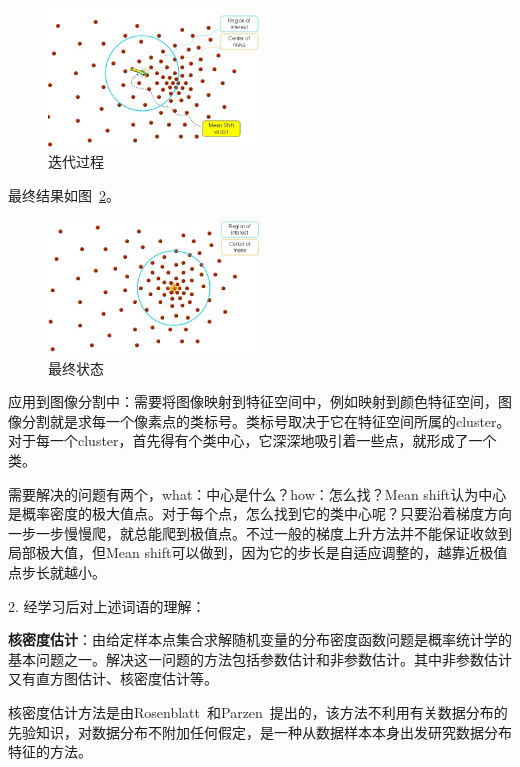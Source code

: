 \documentclass[12pt]{article}
\begin{document}
\begin{figure}[!ht]
\centering
\includegraphics[width=0.5\textwidth]{meanshift2.jpg}
\caption{迭代过程}
\label{fig: meanshift2}
\end{figure} 

最终结果如图~\ref{fig: meanshift3}。

\begin{figure}[!ht]
\centering
\includegraphics[width=0.5\textwidth]{meanshift3.jpg}
\caption{最终状态}
\label{fig: meanshift3}
\end{figure} 

应用到图像分割中：需要将图像映射到特征空间中，例如映射到颜色特征空间，图像分割就是求每一个像素点的类标号。类标号取决于它在特征空间所属的cluster。对于每一个cluster，首先得有个类中心，它深深地吸引着一些点，就形成了一个类。

需要解决的问题有两个，what：中心是什么？how：怎么找？Mean shift认为中心是概率密度的极大值点。对于每个点，怎么找到它的类中心呢？只要沿着梯度方向一步一步慢慢爬，就总能爬到极值点。不过一般的梯度上升方法并不能保证收敛到局部极大值，但Mean shift可以做到，因为它的步长是自适应调整的，越靠近极值点步长就越小。

2. 经学习后对上述词语的理解： 

\textbf{核密度估计}：由给定样本点集合求解随机变量的分布密度函数问题是概率统计学的基本问题之一。解决这一问题的方法包括参数估计和非参数估计。其中非参数估计又有直方图估计、核密度估计等。

核密度估计方法是由Rosenblatt~\cite{rosenblatt1956remarks}和Parzen~\cite{parzen1962estimation}提出的，该方法不利用有关数据分布的先验知识，对数据分布不附加任何假定，是一种从数据样本本身出发研究数据分布特征的方法。
\end{document}
